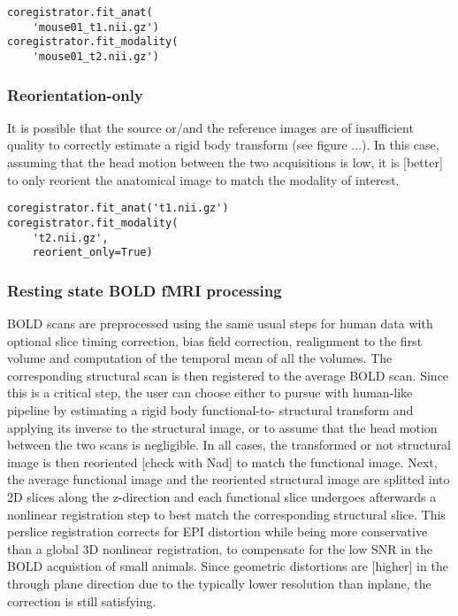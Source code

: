 \documentclass[utf8, a4paper, final, crop]{frontiersSCNS} %
\begin{document}
\begin{verbatim}
coregistrator.fit_anat(
    'mouse01_t1.nii.gz')
coregistrator.fit_modality(
    'mouse01_t2.nii.gz')
\end{verbatim}
\subsubsection{Reorientation-only}

It is possible that the source or/and the reference
images are of insufficient quality to correctly estimate a rigid body transform
(see figure ...). In this case,
assuming that the head motion between the two acquisitions is low, it is [better]
to only reorient the anatomical image to match the modality of interest.
\begin{verbatim}
coregistrator.fit_anat('t1.nii.gz')
coregistrator.fit_modality(
    't2.nii.gz',
    reorient_only=True)
\end{verbatim}

\subsubsection{Resting state BOLD fMRI processing}

BOLD scans are preprocessed using the same usual steps for human data
with optional slice timing correction, bias field correction, realignment to the 
first volume
and computation of the temporal mean of all the volumes.
The corresponding structural scan is then registered to the average BOLD scan.
Since this is a critical step, the user can choose
either to pursue with human-like pipeline by estimating a rigid body functional-to-
structural transform and applying its inverse to the structural image, or to assume 
that the head motion between the two scans is negligible.
In all cases, the transformed or not structural image is then reoriented [check with Nad]
to match the functional image. Next, the average functional image and
the reoriented structural image are
splitted into 2D slices along the z-direction and each functional slice undergoes
afterwards a nonlinear registration step to best match the corresponding structural slice.
This perslice registration corrects for EPI distortion while being more conservative 
than a global 3D nonlinear registration, to compensate for the low SNR in the BOLD acquistion of small animals.
Since geometric distortions are [higher] in the through plane direction due to the typically lower resolution than inplane, the correction is still satisfying.
\end{document}
